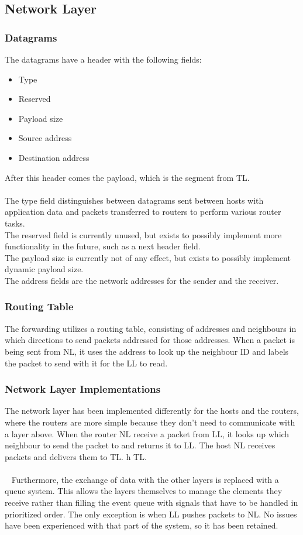 \subsection{Network Layer}
\subsubsection{Datagrams}
\label{sec:DATAGRAM}
The datagrams have a header with the following fields:
\begin{itemize}
\item Type
\item Reserved
\item Payload size
\item Source address
\item Destination address
\end{itemize}

After this header comes the payload, which is the segment from TL.\\
\\
The type field distinguishes between datagrams sent between hosts with application data and packets transferred to routers to perform various router tasks.\\
The reserved field is currently unused, but exists to possibly implement more functionality in the future, such as a next header field.\\
The payload size is currently not of any effect, but exists to possibly implement dynamic payload size.\\
The address fields are the network addresses for the sender and the receiver.

\subsubsection{Routing Table}
The forwarding utilizes a routing table, consisting of addresses and neighbours in which directions to send packets addressed for those addresses. When a packet is being sent from NL, it uses the address to look up the neighbour ID and labels the packet to send with it for the LL to read.

\subsubsection{Network Layer Implementations}
The network layer has been implemented differently for the hosts and the routers, where the routers are more simple because they don't need to communicate with a layer above. When the router NL receive a packet from LL, it looks up which neighbour to send the packet to and returns it to LL. The host NL receives packets and delivers them to TL.
h TL.\\
\\~
Furthermore, the exchange of data with the other layers is replaced with a queue system. This allows the layers themselves to manage the elements they receive rather than filling the event queue with signals that have to be handled in prioritized order. The only exception is when LL pushes packets to NL. No issues have been experienced with that part of the system, so it has been retained.

